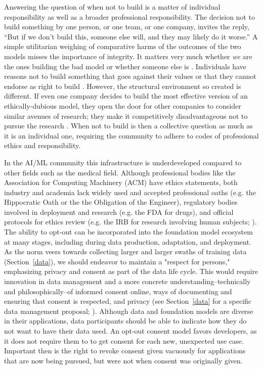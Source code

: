 Answering the question of when not to build is a matter of individual responsibility as well as a broader professional responsibility. The decision not to build something by one person, or one team, or one company, invites the reply, “But if we don’t build this, someone else will, and they may likely do it worse.” A simple utilitarian weighing of comparative harms of the outcomes of the two models misses the importance of integrity. It matters very much whether \textit{we} are the ones building the bad model or whether someone else is \citep{Williams1973}. Individuals have reasons not to build something that goes against their values or that they cannot endorse as right to build \citep{Korsgaard2009}. However, the structural environment so created is different. If even one company decides to build the most effective version of an ethically-dubious model, they open the door for other companies to consider similar avenues of research; they make it competitively disadvantageous not to pursue the research \citep{askell_role_2019}. When not to build is then a collective question as much as it is an individual one, requiring the community to adhere to codes of professional ethics and responsibility. 

In the AI/ML community this infrastructure is underdeveloped compared to other fields such as the medical field. Although professional bodies like the Association for Computing Machinery (ACM) have ethics statements, both industry and academia lack widely used and accepted professional oaths (e.g. the Hippocratic Oath or the the Obligation of the Engineer), regulatory bodies involved in deployment and research (e.g. the FDA for drugs), and official protocols for ethics review (e.g. the IRB for research involving human subjects; \citep{bernstein_esr_2021}). The ability to opt-out can be incorporated into the foundation model ecosystem at many stages, including during data production, adaptation, and deployment. As the norm veers towards collecting larger and larger swaths of training data (Section~\ref{data}), we should endeavor to maintain a "respect for persons," \citep{belmont_report} emphasizing privacy and consent as part of the data life cycle. This would require innovation in data management and a more concrete understanding--technically and philosophically--of informed consent online, ways of documenting and ensuring that consent is respected, and privacy (see Section~\ref{data} for a specific data management proposal; \citep{changingtherules_ohm}). Although data and foundation models are diverse in their applications, data participants should be able to indicate how they do not want to have their data used. An opt-out consent model favors developers, as it does not require them to to get consent for each new, unexpected use case. Important then is the right to revoke consent given vacuously for applications that are now being pursued, but were not when consent was originally given. 

